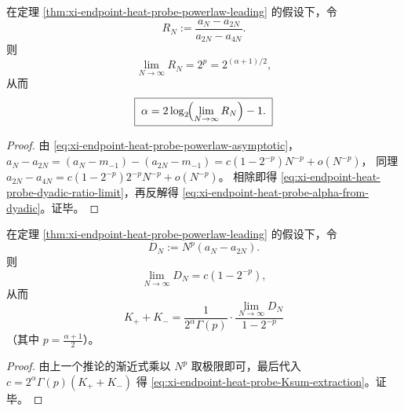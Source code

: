 \begin{corollary}\label{cor:xi-endpoint-heat-probe-dyadic-exponent-readout}
在定理 \ref{thm:xi-endpoint-heat-probe-powerlaw-leading} 的假设下，令
\[
R_N:=\frac{a_N-a_{2N}}{a_{2N}-a_{4N}}.
\]
则
\begin{equation}\label{eq:xi-endpoint-heat-probe-dyadic-ratio-limit}
\boxed{\;\lim_{N\to\infty}R_N=2^{p}=2^{(\alpha+1)/2},\;}
\end{equation}
从而
\begin{equation}\label{eq:xi-endpoint-heat-probe-alpha-from-dyadic}
\boxed{\;\alpha=2\log_2\!\Bigl(\lim_{N\to\infty}R_N\Bigr)-1.\;}
\end{equation}
\end{corollary}
\begin{proof}
由 \eqref{eq:xi-endpoint-heat-probe-powerlaw-asymptotic}，
\(
a_N-a_{2N}=(a_N-m_{-1})-(a_{2N}-m_{-1})
=c(1-2^{-p})N^{-p}+o(N^{-p})
\)，
同理
\(
a_{2N}-a_{4N}=c(1-2^{-p})2^{-p}N^{-p}+o(N^{-p})
\)。
相除即得 \eqref{eq:xi-endpoint-heat-probe-dyadic-ratio-limit}，再反解得 \eqref{eq:xi-endpoint-heat-probe-alpha-from-dyadic}。证毕。
\end{proof}

\begin{corollary}[端点幂律系数的闭式核验提取]\label{cor:xi-endpoint-heat-probe-powerlaw-coefficient-extraction}
在定理 \ref{thm:xi-endpoint-heat-probe-powerlaw-leading} 的假设下，令
\[
D_N:=N^{p}(a_N-a_{2N}).
\]
则
\[
\lim_{N\to\infty}D_N=c(1-2^{-p}),
\]
从而
\begin{equation}\label{eq:xi-endpoint-heat-probe-Ksum-extraction}
\boxed{\;
K_++K_-=\frac{1}{2^\alpha\Gamma(p)}\cdot
\frac{\lim_{N\to\infty}D_N}{1-2^{-p}}\;}
\end{equation}
（其中 \(p=\tfrac{\alpha+1}{2}\)）。
\end{corollary}
\begin{proof}
由上一个推论的渐近式乘以 \(N^p\) 取极限即可，最后代入 \(c=2^\alpha\Gamma(p)(K_++K_-)\) 得 \eqref{eq:xi-endpoint-heat-probe-Ksum-extraction}。证毕。
\end{proof}

